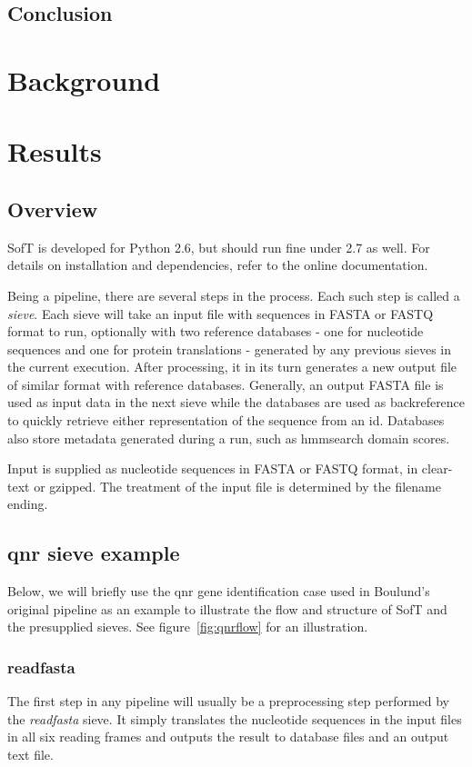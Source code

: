 \documentclass[a4paper,12pt]{article}
\begin{document}
\subsection{Conclusion}

\section{Background}
\section{Results}
\subsection{Overview}
SofT is developed for Python 2.6, but should run fine under 2.7 as well. For details on installation and dependencies, refer to the online documentation.

Being a pipeline, there are several steps in the process. Each such step is called a \emph{sieve}. Each sieve will take an input file with sequences in FASTA or FASTQ format to run, optionally with two reference databases - one for nucleotide sequences and one for protein translations - generated by any previous sieves in the current execution. After processing, it in its turn generates a new output file of similar format with reference databases. Generally, an output FASTA file is used as input data in the next sieve while the databases are used as backreference to quickly retrieve either representation of the sequence from an id. Databases also store metadata generated during a run, such as hmmsearch domain scores.

Input is supplied as nucleotide sequences in FASTA or FASTQ format, in clear-text or gzipped. The treatment of the input file is determined by the filename ending.

\subsection{qnr sieve example}
Below, we will briefly use the qnr gene identification case used in Boulund's original pipeline as an example to illustrate the flow and structure of SofT and the presupplied sieves. See figure~\ref{fig:qnrflow} for an illustration.

\subsubsection{readfasta}
The first step in any pipeline will usually be a preprocessing step performed by the \emph{readfasta} sieve. It simply translates the nucleotide sequences in the input files in all six reading frames and outputs the result to database files and an output text file.
\end{document}
